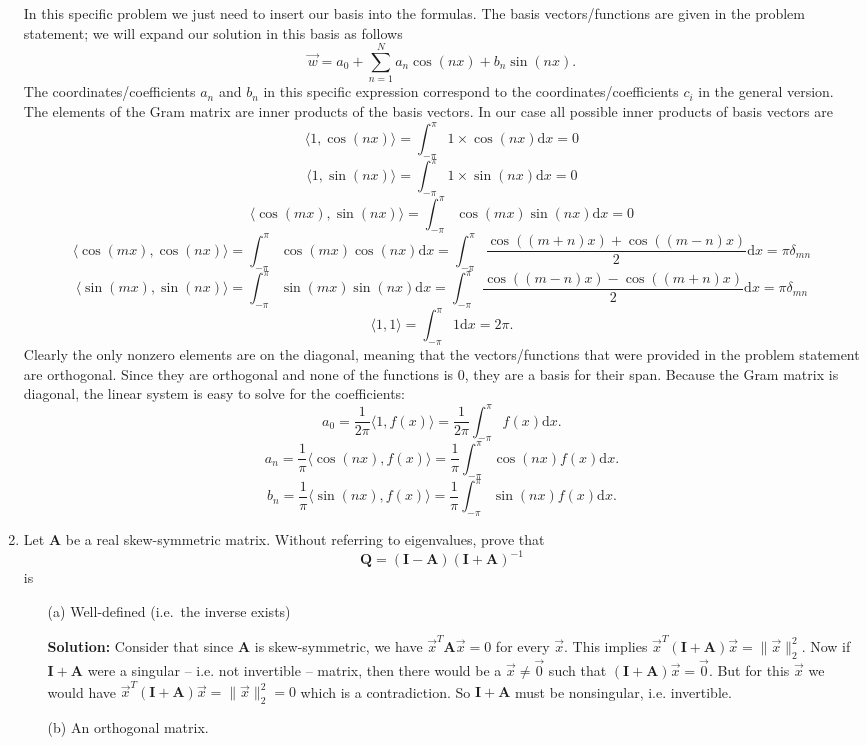 \documentclass[11pt,fleqn]{article}
\begin{document}
\begin{enumerate}
In this specific problem we just need to insert our basis into the formulas.
The basis vectors/functions are given in the problem statement; we will expand our solution in this basis as follows
\[\vec{w} = a_0 + \sum_{n=1}^N a_n\cos(nx)+b_n\sin(nx).\]
The coordinates/coefficients $a_n$ and $b_n$ in this specific expression correspond to the coordinates/coefficients $c_i$ in the general version.
The elements of the Gram matrix are inner products of the basis vectors.
In our case all possible inner products of basis vectors are
\[\langle 1,\cos(nx)\rangle = \int_{-\pi}^\pi 1\times \cos(n x)\mathrm{d}x = 0\]
\[\langle 1,\sin(nx)\rangle = \int_{-\pi}^\pi 1\times \sin(n x)\mathrm{d}x = 0\]
\[\langle\cos(m x),\sin(nx)\rangle = \int_{-\pi}^\pi \cos(mx)\sin(n x)\mathrm{d}x = 0\]
\[\langle \cos(mx),\cos(nx)\rangle = \int_{-\pi}^\pi \cos(mx)\cos(n x)\mathrm{d}x = \int_{-\pi}^\pi \frac{\cos((m+n)x)+\cos((m-n)x)}{2}\mathrm{d}x = \pi\delta_{mn}\]
\[\langle \sin(mx),\sin(nx)\rangle = \int_{-\pi}^\pi \sin(mx)\sin(n x)\mathrm{d}x = \int_{-\pi}^\pi \frac{\cos((m-n)x)-\cos((m+n)x)}{2}\mathrm{d}x = \pi\delta_{mn}\]
\[\langle 1,1\rangle = \int_{-\pi}^\pi 1\mathrm{d}x = 2\pi.\]
Clearly the only nonzero elements are on the diagonal, meaning that the vectors/functions that were provided in the problem statement are orthogonal.
Since they are orthogonal and none of the functions is 0, they are a basis for their span.
Because the Gram matrix is diagonal, the linear system is easy to solve for the coefficients:
\[a_0 = \frac{1}{2\pi}\langle 1,f(x)\rangle = \frac{1}{2\pi}\int_{-\pi}^\pi f(x)\mathrm{d}x.\]
\[a_n = \frac{1}{\pi}\langle\cos(nx),f(x)\rangle = \frac{1}{\pi}\int_{-\pi}^\pi\cos(nx) f(x)\mathrm{d}x.\]
\[b_n = \frac{1}{\pi}\langle\sin(nx),f(x)\rangle = \frac{1}{\pi}\int_{-\pi}^\pi\sin(nx) f(x)\mathrm{d}x.\]


\item Let $\mathbf{A}$ be a real skew-symmetric matrix. Without referring to eigenvalues, prove that
\[\mathbf{Q} = (\mathbf{I}-\mathbf{A})(\mathbf{I}+\mathbf{A})^{-1}\]
is
	\begin{itemize}
	\item[(a)] Well-defined (i.e.\ the inverse exists)
	
	{\bf Solution:} Consider that since $\mathbf{A}$ is skew-symmetric, we have $\vec{x}^T\mathbf{A}\vec{x} = 0$ for every $\vec{x}$. This implies $\vec{x}^T(\mathbf{I}+\mathbf{A})\vec{x} = \|\vec{x}\|_2^2$. Now if $\mathbf{I} + \mathbf{A}$ were a singular -- i.e. not invertible -- matrix, then there would be a $\vec{x}\neq\vec{0}$ such that $(\mathbf{I} + \mathbf{A})\vec{x} = \vec{0}$. But for this $\vec{x}$ we would have $\vec{x}^T(\mathbf{I}+\mathbf{A})\vec{x} = \|\vec{x}\|_2^2=0$ which is a contradiction. So $\mathbf{I} + \mathbf{A}$ must be nonsingular, i.e. invertible.
	\item[(b)] An orthogonal matrix.
	

\end{itemize}
\end{enumerate}
\end{document}
